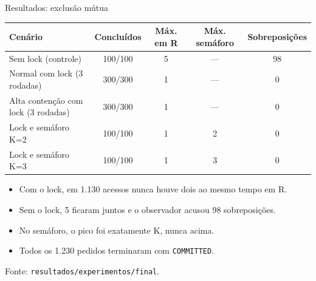 \documentclass[aspectratio=169,11pt]{beamer}
\begin{document}
\begin{frame}{Resultados: exclusão mútua}
\small
\setlength{\tabcolsep}{4pt}
\renewcommand{\arraystretch}{1.25}
\begin{tabular}{@{}lcccc@{}}
\toprule
\textbf{Cenário} & \textbf{Concluídos} & \textbf{Máx. em R} & \textbf{Máx. semáforo} & \textbf{Sobreposições}\\
\midrule
Sem lock (controle) & 100/100 & 5 & --- & 98\\
Normal com lock (3 rodadas) & 300/300 & 1 & --- & 0\\
Alta contenção com lock (3 rodadas) & 300/300 & 1 & --- & 0\\
Lock e semáforo K=2 & 100/100 & 1 & 2 & 0\\
Lock e semáforo K=3 & 100/100 & 1 & 3 & 0\\
\bottomrule
\end{tabular}
\vspace{0.25cm}
\begin{itemize}\setlength\itemsep{0.12cm}
\item Com o lock, em 1.130 acessos nunca houve dois ao mesmo tempo em R.
\item Sem o lock, 5 ficaram juntos e o observador acusou 98 sobreposições.
\item No semáforo, o pico foi exatamente K, nunca acima.
\item Todos os 1.230 pedidos terminaram com \texttt{COMMITTED}.
\end{itemize}
{\scriptsize Fonte: \texttt{resultados/experimentos/final}.}
\end{frame}
\end{document}
